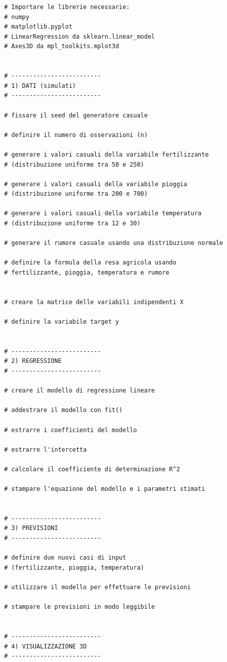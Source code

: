\documentclass[a4paper,12pt]{article}
\begin{document}
	\begin{lstlisting}
		# Importare le librerie necessarie:
		# numpy
		# matplotlib.pyplot
		# LinearRegression da sklearn.linear_model
		# Axes3D da mpl_toolkits.mplot3d
		
		
		# -------------------------
		# 1) DATI (simulati)
		# -------------------------
		
		# fissare il seed del generatore casuale
		
		# definire il numero di osservazioni (n)
		
		# generare i valori casuali della variabile fertilizzante
		# (distribuzione uniforme tra 50 e 250)
		
		# generare i valori casuali della variabile pioggia
		# (distribuzione uniforme tra 200 e 700)
		
		# generare i valori casuali della variabile temperatura
		# (distribuzione uniforme tra 12 e 30)
		
		# generare il rumore casuale usando una distribuzione normale
		
		# definire la formula della resa agricola usando
		# fertilizzante, pioggia, temperatura e rumore
		
		
		# creare la matrice delle variabili indipendenti X
		
		# definire la variabile target y
		
		
		# -------------------------
		# 2) REGRESSIONE
		# -------------------------
		
		# creare il modello di regressione lineare
		
		# addestrare il modello con fit()
		
		# estrarre i coefficienti del modello
		
		# estrarre l'intercetta
		
		# calcolare il coefficiente di determinazione R^2
		
		# stampare l'equazione del modello e i parametri stimati
		
		
		# -------------------------
		# 3) PREVISIONI
		# -------------------------
		
		# definire due nuovi casi di input
		# (fertilizzante, pioggia, temperatura)
		
		# utilizzare il modello per effettuare le previsioni
		
		# stampare le previsioni in modo leggibile
		
		
		# -------------------------
		# 4) VISUALIZZAZIONE 3D
		# -------------------------
		

\end{lstlisting}
\end{document}
